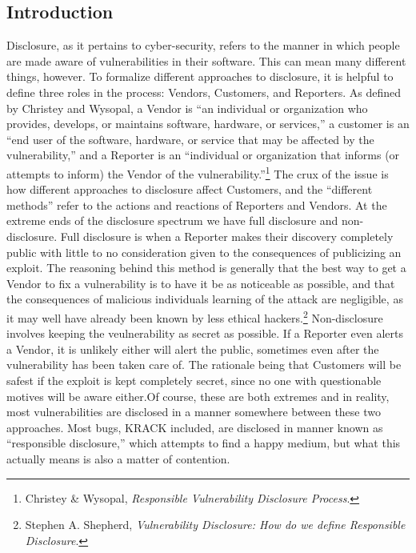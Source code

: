\documentclass[12pt]{article}
\begin{document}
\begin{doublespace}
\section*{Introduction}
Disclosure, as it pertains to cyber-security, refers to the manner in which
people are made aware of vulnerabilities in their software. This can mean many
different things, however. To formalize different approaches to disclosure, it
is helpful to define three roles in the process: Vendors, Customers, and
Reporters. As defined by Christey and Wysopal,
a Vendor is ``an individual or organization who provides, develops, or
maintains software, hardware, or services,'' a customer is 
an ``end user of the software, hardware, or service that may be affected by the
vulnerability,'' and a Reporter is an ``individual or organization that informs
(or attempts to inform) the Vendor of the vulnerability.''\footnote{Christey \& Wysopal, \textit{Responsible Vulnerability Disclosure Process}.}
The crux of the
issue is how different approaches to disclosure affect Customers, and the
``different methods'' refer to the actions and reactions of Reporters and
Vendors. At the extreme ends of the disclosure spectrum we have full disclosure
and non-disclosure. Full disclosure is when a Reporter makes their discovery
completely public with little to no consideration given to the consequences of
publicizing an exploit. The reasoning behind this method is generally that the
best way to get a Vendor to fix a vulnerability is to have it be as noticeable
as possible, and
that the consequences of malicious individuals learning of the attack are
negligible, as it may well have already been known by less ethical hackers.\footnote{Stephen A. Shepherd, \textit{ Vulnerability Disclosure: How do we define Responsible Disclosure}.}
Non-disclosure involves keeping the veulnerability as secret as possible. If a
Reporter even alerts a Vendor, it is unlikely either will
alert the public, sometimes even after the vulnerability has been taken
care of. The rationale being that Customers will be safest if the exploit is
kept completely secret, since no one with questionable motives will be aware
either.\footnotemark[2]
Of course, these are both extremes and in reality, most
vulnerabilities are disclosed in a manner somewhere between these two
approaches. Most bugs, KRACK included, are disclosed in manner known as
``responsible disclosure,'' which attempts to find a happy medium, but what
this actually means is also a matter of contention.


\end{doublespace}
\end{document}
